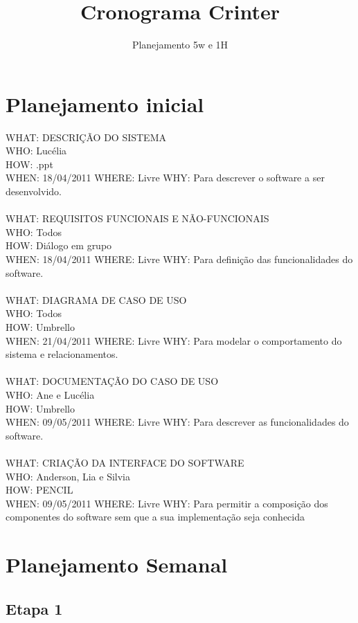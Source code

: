 \documentclass[12pt,a4paper]{article}
\author{Planejamento 5w e 1H}
\title{\Huge Cronograma Crinter}
\date{}
\begin{document}
\maketitle

\section*{Planejamento inicial}


WHAT: DESCRIÇÃO DO SISTEMA\\
WHO: Lucélia\\
HOW: .ppt\\
WHEN: 18/04/2011 WHERE: Livre WHY: Para descrever o software a ser desenvolvido.\\
\\
WHAT: REQUISITOS FUNCIONAIS E NÃO-FUNCIONAIS\\
WHO: Todos\\
HOW: Diálogo em grupo\\ 
WHEN: 18/04/2011  WHERE: Livre  WHY: Para definição das funcionalidades do software.\\
\\
WHAT: DIAGRAMA DE CASO DE USO\\ 
WHO: Todos\\
HOW: Umbrello\\
WHEN: 21/04/2011  WHERE: Livre  WHY: Para modelar o comportamento do sistema e relacionamentos.\\
\\
WHAT: DOCUMENTAÇÃO DO CASO DE USO\\ 
WHO: Ane e Lucélia\\
HOW: Umbrello\\
WHEN: 09/05/2011  WHERE: Livre  WHY: Para descrever as funcionalidades do software.\\
\\
WHAT: CRIAÇÃO DA INTERFACE DO SOFTWARE\\
WHO: Anderson, Lia e Silvia\\
HOW: PENCIL\\
WHEN: 09/05/2011  WHERE: Livre  WHY: Para permitir a composição dos componentes do software sem que a sua 
implementação seja conhecida
\newpage

\section*{Planejamento Semanal}
\subsection*{Etapa 1}
\end{document}
